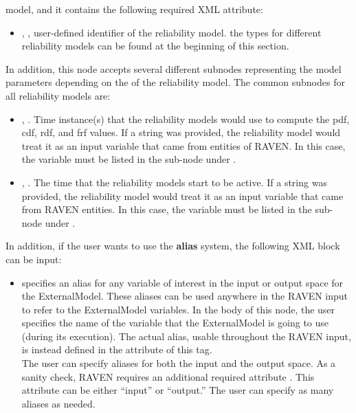 \begin{itemize}
	model, and it contains the following required XML attribute:
	\begin{itemize}
		\item {}, , user-defined identifier of the reliability model.
		\nb the types for different reliability models can be found at the beginning of this section.
	\end{itemize}
	In addition, this node accepts several different subnodes representing the model parameters depending on the
	 of the reliability model. The common subnodes for all reliability models are:
	\begin{itemize}
		\item {}, . Time instance(s)
		that the reliability models would use to compute the pdf, cdf, rdf, and frf values. If a string was provided,
		the reliability model would treat it as an input variable that came from entities of RAVEN. In this
		case, the variable must be listed in the sub-node  under .
		\item {}, . The time that the reliability models start to be active.
		If a string was provided, the reliability model would treat it as an input variable that came
		from RAVEN entities. In this case, the variable must be listed in the sub-node 
		under .
	\end{itemize}
\end{itemize}
In addition, if the user wants to use the \textbf{alias} system, the following XML block can be input:
\begin{itemize}
	\item {}  specifies an alias for
	any variable of interest in the input or output space for the ExternalModel.
	These aliases can be used anywhere in the RAVEN input to refer to the ExternalModel
	variables.
	In the body of this node, the user specifies the name of the variable that the ExternalModel is
	going to use (during its execution).
	The actual alias, usable throughout the RAVEN input, is instead defined in the
	 attribute of this tag.
	\\The user can specify aliases for both the input and the output space. As a sanity check, RAVEN
	requires an additional required attribute . This attribute can be either ``input'' or ``output.''
	\nb The user can specify as many aliases as needed.
\end{itemize}

